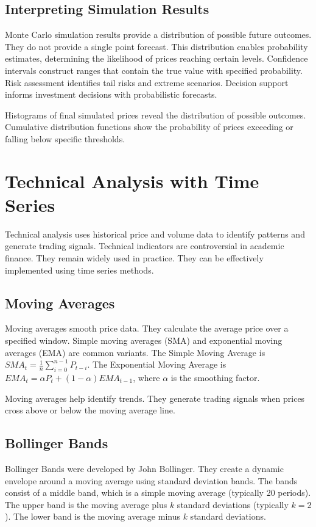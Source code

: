 \subsection{Interpreting Simulation Results}

Monte Carlo simulation results provide a distribution of possible future outcomes. They do not provide a single point forecast. This distribution enables probability estimates, determining the likelihood of prices reaching certain levels. Confidence intervals construct ranges that contain the true value with specified probability. Risk assessment identifies tail risks and extreme scenarios. Decision support informs investment decisions with probabilistic forecasts.

Histograms of final simulated prices reveal the distribution of possible outcomes. Cumulative distribution functions show the probability of prices exceeding or falling below specific thresholds.

\section{Technical Analysis with Time Series}

Technical analysis uses historical price and volume data to identify patterns and generate trading signals. Technical indicators are controversial in academic finance. They remain widely used in practice. They can be effectively implemented using time series methods.

\subsection{Moving Averages}

Moving averages smooth price data. They calculate the average price over a specified window. Simple moving averages (SMA) and exponential moving averages (EMA) are common variants. The Simple Moving Average is \(SMA_t = \frac{1}{n}\sum_{i=0}^{n-1} P_{t-i}\). The Exponential Moving Average is \(EMA_t = \alpha P_t + (1-\alpha)EMA_{t-1}\), where \(\alpha\) is the smoothing factor.

Moving averages help identify trends. They generate trading signals when prices cross above or below the moving average line.

\subsection{Bollinger Bands}

Bollinger Bands were developed by John Bollinger. They create a dynamic envelope around a moving average using standard deviation bands. The bands consist of a middle band, which is a simple moving average (typically 20 periods). The upper band is the moving average plus \(k\) standard deviations (typically \(k=2\)). The lower band is the moving average minus \(k\) standard deviations.

